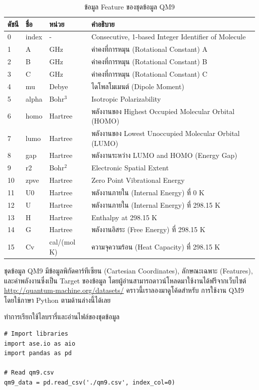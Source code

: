 \begin{table}[htbp]
    \centering
    \caption{ข้อมูล Feature ของชุดข้อมูล QM9}
    \label{tab:qm9_feature}
    \small
    \begin{tabular}{llll}\toprule
    \textbf{ดัชนี} &\textbf{ชื่อ} &\textbf{หน่วย} &\textbf{คำอธิบาย} \\\midrule
    0 &index &- &Consecutive, 1-based Integer Identifier of Molecule \\
    1 &A &GHz &ค่าคงที่การหมุน (Rotational Constant) A \\
    2 &B &GHz &ค่าคงที่การหมุน (Rotational Constant) B \\
    3 &C &GHz &ค่าคงที่การหมุน (Rotational Constant) C \\
    4 &mu &Debye &ไดโพลโมเมนต์ (Dipole Moment) \\
    5 &alpha &Bohr$^3$ &Isotropic Polarizability \\
    6 &homo &Hartree &พลังงานของ Highest Occupied Molecular Orbital (HOMO) \\
    7 &lumo &Hartree &พลังงานของ Lowest Unoccupied Molecular Orbital (LUMO) \\
    8 &gap &Hartree &พลังงานระหว่าง LUMO and HOMO (Energy Gap) \\
    9 &r2 &Bohr$^2$ &Electronic Spatial Extent \\
    10 &zpve &Hartree &Zero Point Vibrational Energy \\
    11 &U0 &Hartree &พลังงานภายใน (Internal Energy) ที่ 0 K \\
    12 &U &Hartree &พลังงานภายใน (Internal Energy) ที่ 298.15 K \\
    13 &H &Hartree &Enthalpy at 298.15 K \\
    14 &G &Hartree &พลังงานอิสระ (Free Energy) ที่ 298.15 K \\
    15 &Cv &cal/(mol K) &ความจุความร้อน (Heat Capacity) ที่ 298.15 K \\
    \bottomrule
    \end{tabular}
\end{table}

ชุดข้อมูล QM9 มีข้อมูลพิกัดคาร์ทีเซียน (Cartesian Coordinates), ลักษณะเฉพาะ (Features), และค่าพลังงานซึ่งเป็น Target ของข้อมูล 
โดยผู้อ่านสามารถดาวน์โหลดมาใช้งานได้ฟรีจากเว็บไซต์ \url{http://quantum-machine.org/datasets/} คราวนี้เราลองมาดูโค้ดสำหรับ%
การใช้งาน QM9 โดยใช้ภาษา Python ตามด้านล่างนี้ได้เลย

\noindent ทำการเรียกใช้ไลบรารี่และอ่านไฟล์ของชุดข้อมูล

\begin{lstlisting}[style=MyPython]
# Import libraries
import ase.io as aio
import pandas as pd

# Read qm9.csv
qm9_data = pd.read_csv('./qm9.csv', index_col=0)
\end{lstlisting}

